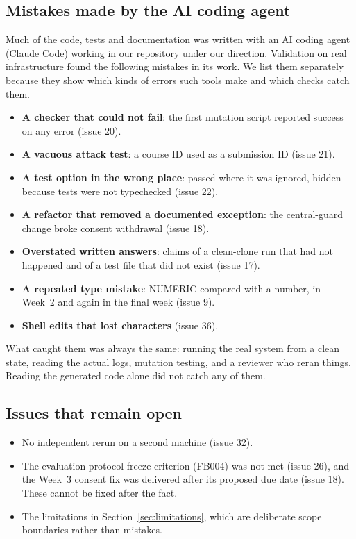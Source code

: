 \subsection{Mistakes made by the AI coding agent}
Much of the code, tests and documentation was written with an AI coding agent (Claude Code) working in our repository under our direction. Validation on real infrastructure found the following mistakes in its work. We list them separately because they show which kinds of errors such tools make and which checks catch them.
\begin{itemize}
  \item \textbf{A checker that could not fail}: the first mutation script reported success on any error (issue 20).
  \item \textbf{A vacuous attack test}: a course ID used as a submission ID (issue 21).
  \item \textbf{A test option in the wrong place}:  passed where it was ignored, hidden because tests were not typechecked (issue 22).
  \item \textbf{A refactor that removed a documented exception}: the central-guard change broke consent withdrawal (issue 18).
  \item \textbf{Overstated written answers}: claims of a clean-clone run that had not happened and of a test file that did not exist (issue 17).
  \item \textbf{A repeated type mistake}: NUMERIC compared with a number, in Week~2 and again in the final week (issue 9).
  \item \textbf{Shell edits that lost characters} (issue 36).
\end{itemize}
What caught them was always the same: running the real system from a clean state, reading the actual logs, mutation testing, and a reviewer who reran things. Reading the generated code alone did not catch any of them.

\subsection{Issues that remain open}
\begin{itemize}
  \item No independent rerun on a second machine (issue 32).
  \item The evaluation-protocol freeze criterion (FB004) was not met (issue 26), and the Week~3 consent fix was delivered after its proposed due date (issue 18). These cannot be fixed after the fact.
  \item The limitations in Section~\ref{sec:limitations}, which are deliberate scope boundaries rather than mistakes.
\end{itemize}
